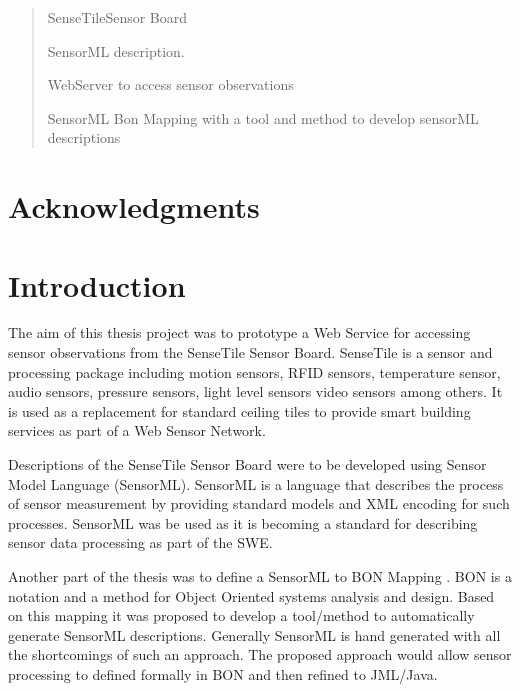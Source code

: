 \documentclass[]{final_report}
\begin{document}
\maketitle
\tableofcontents{}\newpage


\begin{abstract}
SenseTileSensor Board

SensorML description.

WebServer to access sensor observations

SensorML Bon Mapping with a tool and method to develop sensorML descriptions

\end{abstract}




\newpage



\chapter*{Acknowledgments}



\chapter{Introduction}

The aim of this thesis project was to prototype a Web Service for accessing sensor observations from the SenseTile Sensor Board. SenseTile is a sensor and processing package including motion sensors, RFID sensors, temperature sensor, audio sensors, pressure sensors, light level sensors video sensors among others. It is used as a replacement for standard ceiling tiles to provide smart building services as part of a Web Sensor Network.

Descriptions of the SenseTile Sensor Board were to be developed using Sensor Model Language (SensorML)\cite{SensoMLref}. SensorML is a language that describes the process of sensor measurement by providing standard models and XML encoding for such processes. SensorML was be used as it is becoming a standard for describing sensor data processing as part of the SWE.

Another part of the thesis was to define a SensorML to BON Mapping . BON\cite{BONref} is a notation and a method for Object Oriented systems analysis and design. Based on this mapping it was proposed to develop a tool/method to automatically generate SensorML descriptions. Generally SensorML is hand generated with all the shortcomings of such an approach. The proposed approach would allow sensor processing to defined formally in BON and then refined to JML/Java. 
\end{document}
